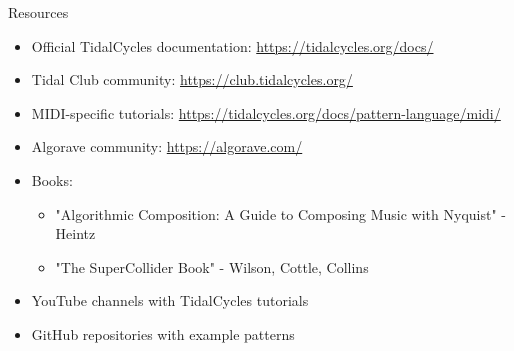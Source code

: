 \documentclass{beamer}
\begin{document}
\begin{frame}{Resources}
\begin{itemize}
    \item Official TidalCycles documentation: \url{https://tidalcycles.org/docs/}
    \item Tidal Club community: \url{https://club.tidalcycles.org/}
    \item MIDI-specific tutorials: \url{https://tidalcycles.org/docs/pattern-language/midi/}
    \item Algorave community: \url{https://algorave.com/}
    \item Books:
    \begin{itemize}
        \item "Algorithmic Composition: A Guide to Composing Music with Nyquist" - Heintz
        \item "The SuperCollider Book" - Wilson, Cottle, Collins
    \end{itemize}
    \item YouTube channels with TidalCycles tutorials
    \item GitHub repositories with example patterns
\end{itemize}
\end{frame}
\end{document}

